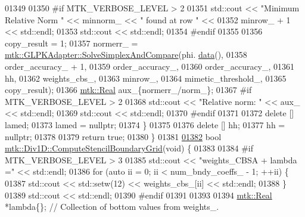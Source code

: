 \begin{DoxyCode}
{{01349 
01350 \textcolor{preprocessor}{    #if MTK\_VERBOSE\_LEVEL > 2}
01351     std::cout << \textcolor{stringliteral}{"Minimum Relative Norm "} << minnorm\_ << \textcolor{stringliteral}{" found at row "} <<
01352       minrow\_ + 1 << std::endl;
01353     std::cout << std::endl;
01354 \textcolor{preprocessor}{    #endif}
01355 
01356     copy\_result = 1;
01357     normerr\_ = \hyperlink{classmtk_1_1GLPKAdapter_a0c9ebb125445bc5af752bf4fb47f44b2}{mtk::GLPKAdapter::SolveSimplexAndCompare}(phi.
      \hyperlink{classmtk_1_1DenseMatrix_a0c33b8a9e01d157c61ddbdf807c25d84}{data}(),
01358                                                         order\_accuracy\_ + 1,
01359                                                         order\_accuracy\_,
01360                                                         order\_accuracy\_,
01361                                                         hh,
01362                                                         weights\_cbs\_,
01363                                                         minrow\_,
01364                                                         mimetic\_threshold\_,
01365                                                         copy\_result);
01366     \hyperlink{group__c01-roots_gac080bbbf5cbb5502c9f00405f894857d}{mtk::Real} aux\_\{normerr\_/norm\_\};
01367 \textcolor{preprocessor}{    #if MTK\_VERBOSE\_LEVEL > 2}
01368     std::cout << \textcolor{stringliteral}{"Relative norm: "} << aux\_ << std::endl;
01369     std::cout << std::endl;
01370 \textcolor{preprocessor}{    #endif}
01371 
01372     \textcolor{keyword}{delete} [] lamed;
01373     lamed = \textcolor{keyword}{nullptr};
01374   \}
01375 
01376   \textcolor{keyword}{delete} [] hh;
01377   hh = \textcolor{keyword}{nullptr};
01378 
01379   \textcolor{keywordflow}{return} \textcolor{keyword}{true};
01380 \}
01381 
\hypertarget{mtk__div__1d_8cc_source_l01382}{}\hyperlink{classmtk_1_1Div1D_a29bb417c76286414dce9258a0bcb5aab}{01382} \textcolor{keywordtype}{bool} \hyperlink{classmtk_1_1Div1D_a29bb417c76286414dce9258a0bcb5aab}{mtk::Div1D::ComputeStencilBoundaryGrid}(\textcolor{keywordtype}{void}) \{
01383 
01384 \textcolor{preprocessor}{  #if MTK\_VERBOSE\_LEVEL > 3}
01385   std::cout << \textcolor{stringliteral}{"weights\_CBSA + lambda ="} << std::endl;
01386   \textcolor{keywordflow}{for} (\textcolor{keyword}{auto} ii = 0; ii < num\_bndy\_coeffs\_ - 1; ++ii) \{
01387     std::cout << std::setw(12) << weights\_cbs\_[ii] << std::endl;
01388   \}
01389   std::cout << std::endl;
01390 \textcolor{preprocessor}{  #endif}
01391 
01393 
01394   \hyperlink{group__c01-roots_gac080bbbf5cbb5502c9f00405f894857d}{mtk::Real} *lambda\{\}; \textcolor{comment}{// Collection of bottom values from weights\_.}
}}
\end{DoxyCode}
